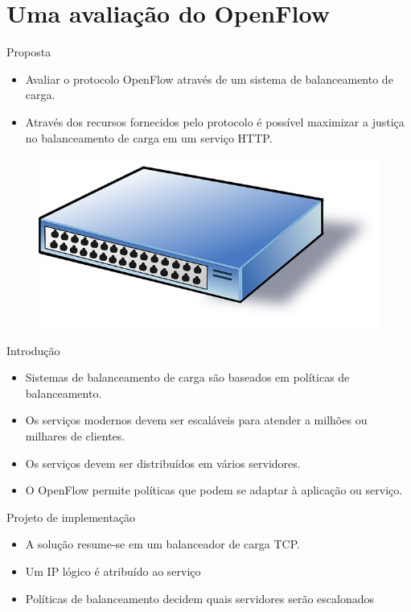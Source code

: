 \section{Uma avaliação do OpenFlow}

\begin{frame}{Proposta}

    \begin{itemize}
        \item Avaliar o protocolo OpenFlow através de um sistema de
            balanceamento de carga.
        \item Através dos recursos fornecidos pelo protocolo é possível 
            maximizar a justiça no balanceamento de carga em um serviço HTTP.
    \end{itemize}

    \begin{figure}[!htb]
        \centering
        \includegraphics[scale=.3]{images/cartoon-switch}
    \end{figure}
\end{frame}


\begin{frame}{Introdução}
    \begin{itemize}
        \setlength{\itemsep}{.5cm}
        \item Sistemas de balanceamento de carga são baseados em políticas 
            de balanceamento.
        \item Os serviços modernos devem ser escaláveis para atender a 
            milhões ou milhares de clientes.
        \item Os serviços devem ser distribuídos em vários servidores. 
        \item O OpenFlow permite políticas que podem se adaptar à aplicação 
            ou serviço.
    \end{itemize} 
\end{frame}


\begin{frame}{Projeto de implementação}

    \begin{itemize}
        \setlength{\itemsep}{.5cm}
        \item A solução resume-se em um balanceador de carga TCP.
        \item Um IP lógico é atribuído ao serviço
        \item Políticas de balanceamento decidem quais servidores serão
            escalonados
    \end{itemize}

\end{frame}

